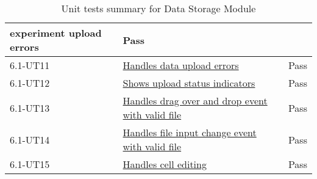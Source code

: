 \documentclass[12pt, titlepage]{article}
\begin{document}
\begin{table}[H]
\begin{tabular}{|l|l|l|}
{    experiment upload errors} & Pass \\
    \hline
    6.1-UT11 &
    \href{https://github.com/SumanyaG/Alkalytics/blob/main/src/backend/test/migrationServiceTest.py}{Handles
    data upload errors} & Pass \\
    \hline
    6.1-UT12 &
    \href{https://github.com/SumanyaG/Alkalytics/blob/main/src/frontend/test/hooks/UploadArea.test.tsxy}{Shows
    upload status indicators} & Pass \\
    \hline
    6.1-UT13 &
    \href{https://github.com/SumanyaG/Alkalytics/blob/main/src/frontend/test/hooks/UploadArea.test.tsx}{Handles
    drag over and drop event with valid file} & Pass \\
    \hline
    6.1-UT14 &
    \href{https://github.com/SumanyaG/Alkalytics/blob/main/src/frontend/test/hooks/UploadArea.test.tsx}{Handles
    file input change event with valid file} & Pass \\
    \hline
    6.1-UT15 &
    \href{https://github.com/SumanyaG/Alkalytics/blob/main/src/frontend/test/hooks/TableBody.test.tsx}{Handles
    cell editing} & Pass \\
    \hline
  \end{tabular}
  \caption{Unit tests summary for Data Storage Module}
  \label{UT:DataStorage}
\end{table}


\newpage
\end{document}
